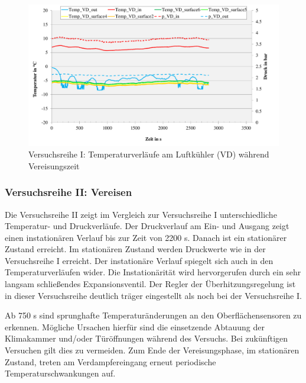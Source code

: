 \begin{figure}[htb]
\centering		\includegraphics[page=1,width=1.08\textwidth]{Pictures/Inbetriebnahme/Abtaumethoden_Tempverlaufe_Vereisen.pdf}
\caption{Versuchsreihe I: Temperaturverläufe am Luftkühler (VD) während Vereisungszeit}
\label{fig:VereisenI}
\end{figure}


\subsubsection*{Versuchsreihe II: Vereisen}

Die Versuchsreihe II zeigt im Vergleich zur Versuchsreihe I unterschiedliche Temperatur- und Druckverläufe. Der Druckverlauf am Ein- und Ausgang zeigt einen instationären Verlauf bis zur Zeit von 2200 s. Danach ist ein stationärer Zustand erreicht. Im stationären Zustand werden Druckwerte wie in der Versuchsreihe I erreicht. Der instationäre Verlauf spiegelt sich auch in den Temperaturverläufen wider. Die Instationärität wird hervorgerufen durch ein sehr langsam schließendes Expansionsventil. Der Regler der Überhitzungsregelung ist in dieser Versuchsreihe deutlich träger eingestellt als noch bei der Versuchsreihe I. 

Ab 750 s sind sprunghafte Temperaturänderungen an den Oberflächensensoren zu erkennen. Mögliche Ursachen hierfür sind die einsetzende Abtauung der Klimakammer und/oder Türöffnungen während des Versuchs.  Bei zukünftigen Versuchen gilt dies zu vermeiden. Zum Ende der Vereisungsphase, im stationären Zustand, treten am Verdampfereingang erneut periodische Temperaturschwankungen auf. 

